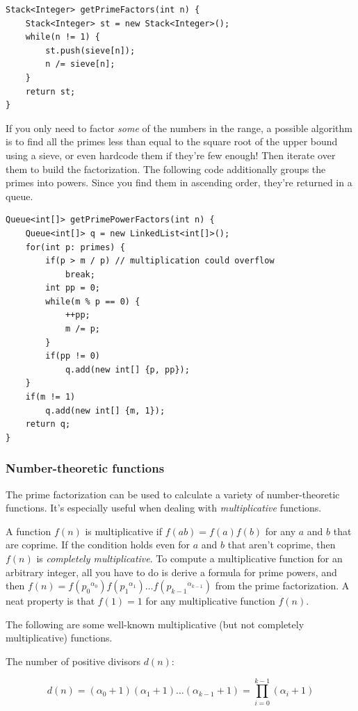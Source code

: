 \documentclass[a4paper,12pt]{article}
\begin{document}
\begin{lstlisting}
Stack<Integer> getPrimeFactors(int n) {
	Stack<Integer> st = new Stack<Integer>();
	while(n != 1) {
		st.push(sieve[n]);
		n /= sieve[n];
	}
	return st;
}
\end{lstlisting}

\noindent If you only need to factor {\em some} of the numbers in the range, a possible algorithm is to find all the primes less than equal to the square root of the upper bound using a sieve, or even hardcode them if they're few enough! Then iterate over them to build the factorization. The following code additionally groups the primes into powers. Since you find them in ascending order, they're returned in a queue.

\begin{lstlisting}
Queue<int[]> getPrimePowerFactors(int n) {
	Queue<int[]> q = new LinkedList<int[]>();
	for(int p: primes) {
		if(p > m / p) // multiplication could overflow
			break;
		int pp = 0;
		while(m % p == 0) {
			++pp;
			m /= p;
		}
		if(pp != 0)
			q.add(new int[] {p, pp});
	}
	if(m != 1)
		q.add(new int[] {m, 1});
	return q;
}
\end{lstlisting}

\subsubsection{Number-theoretic functions}

The prime factorization can be used to calculate a variety of number-theoretic functions. It's especially useful when dealing with {\em multiplicative} functions.

A function $f(n)$ is multiplicative if $f(ab)=f(a)f(b)$ for any $a$ and $b$ that are coprime. If the condition holds even for $a$ and $b$ that aren't coprime, then $f(n)$ is {\em completely multiplicative}. To compute a multiplicative function for an arbitrary integer, all you have to do is derive a formula for prime powers, and then $f(n)=f({p_0}^{\alpha_0})f({p_1}^{\alpha_1})\ldots f({p_{k-1}}^{\alpha_{k-1}})$ from the prime factorization. A neat property is that $f(1)=1$ for any multiplicative function $f(n)$. 

The following are some well-known multiplicative (but not completely multiplicative) functions.

The number of positive divisors $d(n)$:

\[d(n) = (\alpha_0 + 1)(\alpha_1 + 1)\ldots(\alpha_{k-1} + 1) = \prod_{i=0}^{k-1}{(\alpha_i+1)} \]
\end{document}
